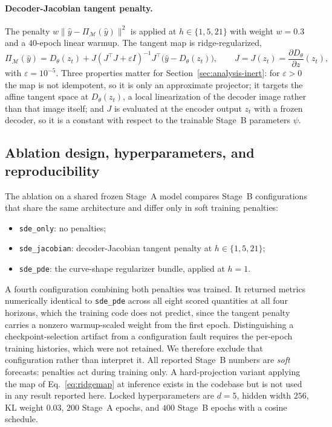 \documentclass{article} %
\begin{document}
\paragraph{Decoder-Jacobian tangent penalty.} The penalty
$w\big\|\hat y-\Pi_{\mathcal{M}}(\hat y)\big\|^2$ is applied at
$h\in\{1,5,21\}$ with weight $w=0.3$ and a $40$-epoch linear warmup. The tangent map
is ridge-regularized,
\begin{equation}
  \Pi_{\mathcal{M}}(\hat y)=D_\theta(z_t)+J(J^{\top}J+\varepsilon I)^{-1}J^{\top}
  \big(\hat y-D_\theta(z_t)\big),
  \qquad J = J(z_t)=\frac{\partial D_\theta}{\partial z}(z_t),
  \label{eq:ridgemap}
\end{equation}
with $\varepsilon = 10^{-5}$. Three properties matter for
Section~\ref{sec:analysis-inert}: for $\varepsilon>0$ the map is not idempotent, so
it is only an approximate projector; it targets the affine tangent space at
$D_\theta(z_t)$, a local linearization of the decoder image rather than that image
itself; and $J$ is evaluated at the encoder output $z_t$ with a frozen decoder, so
it is a constant with respect to the trainable Stage~B parameters $\psi$.
\subsection{Ablation design, hyperparameters, and reproducibility}
\label{sec:setup}
The ablation on a shared frozen Stage~A model compares Stage~B configurations that
share the same architecture and differ only in soft training penalties:
\begin{itemize}
  \item \texttt{sde\_only}: no penalties;
  \item \texttt{sde\_jacobian}: decoder-Jacobian tangent penalty at
        $h\in\{1,5,21\}$;
  \item \texttt{sde\_pde}: the curve-shape regularizer bundle, applied at $h{=}1$.
\end{itemize}
A fourth configuration combining both penalties was trained. It returned metrics
numerically identical to \texttt{sde\_pde} across all eight scored quantities at all
four horizons, which the training code does not predict, since the tangent penalty
carries a nonzero warmup-scaled weight from the first epoch. Distinguishing a
checkpoint-selection artifact from a configuration fault requires the per-epoch
training histories, which were not retained. We therefore exclude that configuration
rather than interpret it.
All reported Stage~B numbers are \emph{soft} forecasts: penalties act during training
only. A hard-projection variant applying the map of Eq.~\eqref{eq:ridgemap} at
inference exists in the codebase but is not used in any result reported here.
Locked hyperparameters are $d=5$, hidden width $256$, KL weight $0.03$, $200$
Stage~A epochs, and $400$ Stage~B epochs with a cosine schedule.
\end{document}
